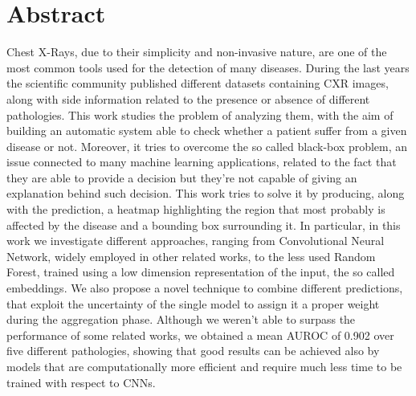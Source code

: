 \chapter*{Abstract}
\label{cha:abstract}

Chest X-Rays, due to their simplicity and non-invasive nature, are one of the most common tools used for the detection of many diseases. During the last years the scientific community published different datasets containing CXR images, along with side information related to the presence or absence of different pathologies.
This work studies the problem of analyzing them, with the aim of building an automatic system able to check whether a patient suffer from a given disease or not. Moreover, it tries to overcome the so called black-box problem, an issue connected to many machine learning applications, related to the fact that they are able to provide a decision but they’re not capable of giving an explanation behind such decision. This work tries to solve it by producing, along with the prediction, a heatmap highlighting the region that most probably is affected by the disease and a bounding box surrounding it. In particular, in this work we investigate different approaches, ranging from Convolutional Neural Network, widely employed in other related works, to the less used Random Forest, trained using a low dimension representation of the input, the so called embeddings. We also propose a novel technique to combine different predictions, that exploit the uncertainty of the single model to assign it a proper weight during the aggregation phase. Although we weren’t able to surpass the performance of some related works, we obtained a mean AUROC of 0.902 over five different pathologies, showing that good results can be achieved also by models that are computationally more efficient and require much less time to be trained with respect to CNNs.
